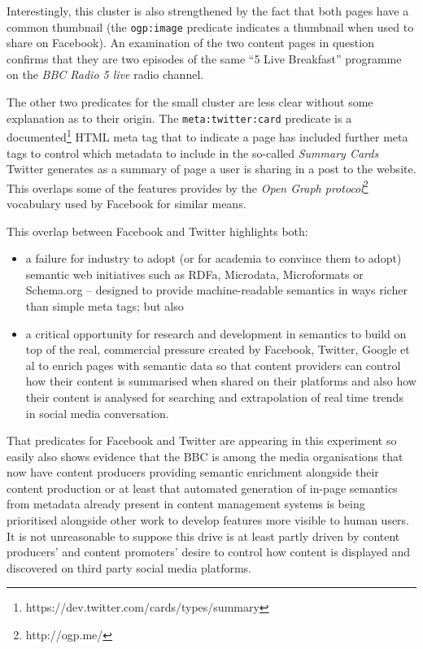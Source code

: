 Interestingly, this cluster is also strengthened by the fact that
both pages have a common thumbnail (the \texttt{ogp:image} predicate
indicates a thumbnail when used to share on Facebook). An examination
of the two content pages in question confirms that they are two
episodes of the same ``5 Live Breakfast'' programme on the
\emph{BBC Radio 5 live} radio channel.

The other two predicates for the small cluster are less clear without
some explanation as to their origin. The \texttt{meta:twitter:card}
predicate is a
documented\footnote{https://dev.twitter.com/cards/types/summary}
HTML meta tag that to indicate a page has included further meta tags
to control which metadata to include in the so-called
\emph{Summary Cards} Twitter generates as a summary of page a user
is sharing in a post to the website. This overlaps some of the
features provides by the \emph{Open Graph protocol}\footnote{http://ogp.me/}
vocabulary used by Facebook for similar means.

This overlap between Facebook and Twitter highlights both:

\begin{itemize}
  \item a failure
    for industry to adopt (or for academia to convince them to adopt)
    semantic web initiatives such as RDFa,
    Microdata, Microformats or Schema.org -- designed to provide
    machine-readable semantics in ways richer than simple meta tags; but
    also
  \item a critical opportunity for research and development in semantics
    to build on top of the real, commercial pressure created by Facebook,
    Twitter, Google et al to enrich pages with semantic data so that
    content providers can control how their content is summarised when
    shared on their platforms and also how their content is analysed for
    searching and extrapolation of real time trends in social media
    conversation.
\end{itemize}

That predicates for Facebook and Twitter are appearing in this
experiment so easily also shows evidence that the BBC is among the
media organisations that now have content producers providing
semantic enrichment alongside their content production or at least
that automated generation of in-page semantics from metadata already
present in content management systems is being prioritised alongside
other work to develop features more visible to human users. It is not
unreasonable to suppose this drive is at least partly driven by
content producers' and content promoters' desire to control how
content is displayed and discovered on third party social media
platforms.

